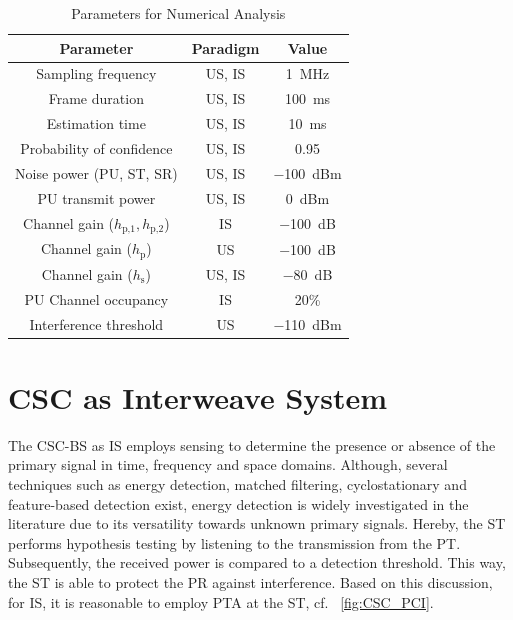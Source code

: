 \documentclass[draftcls, onecolumn, 11pt]{IEEEtran}
\newcommand{\sub}[1]{_{\text{#1}}}
\newcommand{\hp}{h\sub{p}}
\newcommand{\hpo}{h\sub{p,1}}
\newcommand{\hpt}{h\sub{p,2}}
\newcommand{\hs}{h\sub{s}}
\begin{document}
\begin{table}
\renewcommand{\arraystretch}{1.3}
\caption{Parameters for Numerical Analysis}
\label{tb:Para}
\centering
\begin{tabular}{c||c|c}
\hline
\bfseries Parameter & \bfseries {Paradigm} & \bfseries Value \\
\hline\hline
Sampling frequency & US, IS &\SI{1}{MHz} \\ \hline
Frame duration & US, IS & \SI{100}{ms} \\ \hline
Estimation time & US, IS & \SI{10}{ms} \\ \hline
Probability of confidence & US, IS & 0.95 \\ \hline
Noise power (PU, ST, SR) & US, IS &\SI{-100}{dBm} \\ \hline
PU transmit power & US, IS &\SI{0}{dBm} \\ \hline 
Channel gain ($\hpo,\hpt$) & IS & \SI{-100}{dB} \\ \hline
Channel gain ($\hp$) & US &\SI{-100}{dB} \\ \hline
Channel gain ($\hs$)  & US, IS & \SI{-80}{dB} \\ \hline
PU Channel occupancy & IS & 20\% \\ \hline
Interference threshold & US & \SI{-110}{dBm}
\end{tabular}
\end{table}


\section{CSC as Interweave System} \label{sec:para_i}
The CSC-BS as IS employs sensing to determine the presence or absence of the primary signal in time, frequency and space domains. Although, several techniques such as energy detection, matched filtering, cyclostationary and feature-based detection exist, energy detection is widely investigated in the literature due to its versatility towards unknown primary signals. Hereby, the ST performs hypothesis testing by listening to the transmission from the PT. Subsequently, the received power is compared to a detection threshold. This way, the ST is able to protect the PR against interference. Based on this discussion, for IS, it is reasonable to employ PTA at the ST, cf. \figurename~\ref{fig:CSC_PCI}. 
\end{document}
